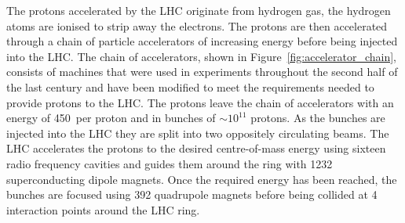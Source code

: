 The protons accelerated by the LHC originate from hydrogen gas, %
the hydrogen atoms are ionised to strip away the electrons. The protons are then accelerated through a chain of particle accelerators of increasing energy before being injected into the LHC. The chain of accelerators, shown in Figure~\ref{fig:accelerator_chain}, consists of machines that were used in experiments throughout the second half of the last century and have been modified to meet the requirements needed to provide protons to the LHC. The protons leave the chain of accelerators with an energy of 450~\gev per proton and in bunches of $\sim 10^{11}$ protons. As the bunches are injected into the LHC they are split into two oppositely circulating beams.
The LHC accelerates the protons to the desired centre-of-mass energy using sixteen radio frequency cavities and guides them around the ring with 1232 superconducting dipole magnets. %
Once the required energy has been reached, the bunches are focused using 392 quadrupole magnets before being collided at 4 interaction points around the LHC ring.%

